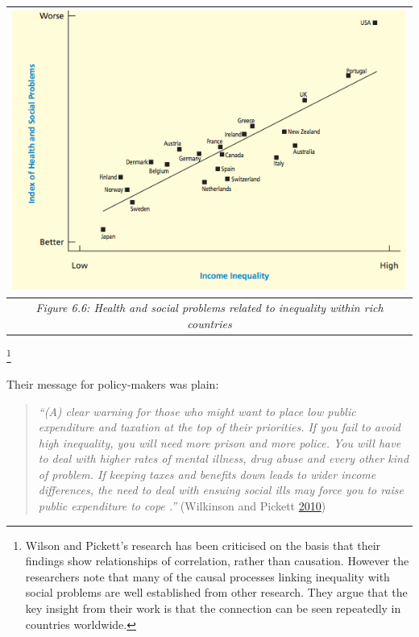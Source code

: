 \documentclass[]{tufte-handout}
\begin{document}
\begin{longtable}[]{@{}c@{}}
\toprule
\begin{minipage}[b]{0.97\columnwidth}\centering
\includegraphics{ChapterPictures/6-5-Healthandsocialproblems.png}\strut
\end{minipage}\tabularnewline
\midrule
\endhead
\begin{minipage}[t]{0.97\columnwidth}\centering
\emph{Figure 6.6: Health and social problems related to inequality
within rich countries}\strut
\end{minipage}\tabularnewline
\bottomrule
\end{longtable}

\footnote{Wilson and Pickett's research has been criticised on the basis
  that their findings show relationships of correlation, rather than
  causation. However the researchers note that many of the causal
  processes linking inequality with social problems are well established
  from other research. They argue that the key insight from their work
  is that the connection can be seen repeatedly in countries worldwide.}

Their message for policy-makers was plain:

\begin{quote}
\emph{``(A) clear warning for those who might want to place low public
expenditure and taxation at the top of their priorities. If you fail to
avoid high inequality, you will need more prison and more police. You
will have to deal with higher rates of mental illness, drug abuse and
every other kind of problem. If keeping taxes and benefits down leads to
wider income differences, the need to deal with ensuing social ills may
force you to raise public expenditure to cope .'' }(Wilkinson and
Pickett \protect\hyperlink{ref-Wilkinson2010}{2010})
\end{quote}
\end{document}

